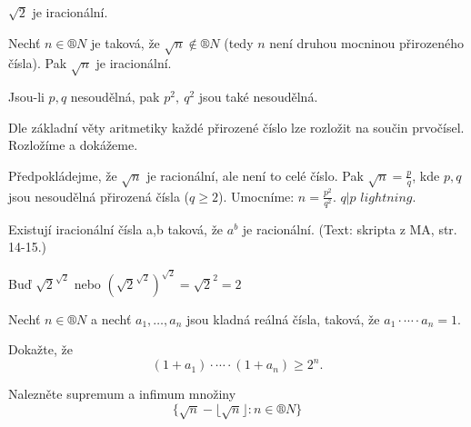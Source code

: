 \documentclass[12pt]{article}					%
\begin{document}
    \begin{priklady}[Z přednášky]
        $\sqrt{2}$ je iracionální.
    \end{priklady}

    \begin{veta}
        Nechť $n \in ®N$ je taková, že $\sqrt{n} \notin ®N$ (tedy $n$ není druhou mocninou přirozeného čísla). Pak $\sqrt{n}$ je iracionální.
        \begin{lemmain}
            Jsou-li $p, q$ nesoudělná, pak $p^2,\ q^2$ jsou také nesoudělná.
            \begin{dukazin}
                Dle základní věty aritmetiky každé přirozené číslo lze rozložit na součin prvočísel. Rozložíme a dokážeme.
            \end{dukazin}
        \end{lemmain}

        \begin{dukazin}[Sporem]
            Předpokládejme, že $\sqrt{n}$ je racionální, ale není to celé číslo. Pak $\sqrt{n} = \frac{p}{q}$, kde $p, q$ jsou nesoudělná přirozená čísla ($q≥2$). Umocníme: $n = \frac{p^2}{q^2}$. $q|p$ $lightning$.
        \end{dukazin}
    \end{veta}

    \begin{veta}[Referát 1]
        Existují iracionální čísla a,b taková, že $a^b$ je racionální. (Text: skripta z MA, str. 14-15.)
        \begin{dukazin}
            Buď $\sqrt{2}^{\sqrt{2}}$ nebo $(\sqrt{2}^{\sqrt{2}})^{\sqrt{2}} = {\sqrt{2}}^2 = 2$
        \end{dukazin}
    \end{veta}

    \begin{priklad}
        Nechť $n \in ®N$ a nechť $a_1, …, a_n$ jsou kladná reálná čísla, taková, že $a_1 \cdot\cdots\cdot a_n = 1$.

        Dokažte, že
        $$ (1+a_1) \cdot\cdots\cdot (1+a_n) ≥ 2^n. $$ 
    \end{priklad}


    \begin{priklad}
        Nalezněte supremum a infimum množiny
        $$ \{\sqrt{n} - \lfloor\sqrt{n}\rfloor : n \in ®N\} $$ 
    \end{priklad}
\end{document}
